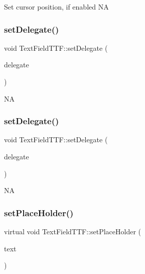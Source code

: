 Set cursor position, if enabled  NA \mbox{\label{classTextFieldTTF_a536d7e986a4623672a6a1506dc5b6684}} 
\subsubsection{\texorpdfstring{set\+Delegate()}{setDelegate()}\hspace{0.1cm}{\footnotesize\ttfamily [1/2]}}
{\footnotesize\ttfamily void Text\+Field\+T\+T\+F\+::set\+Delegate (\begin{DoxyParamCaption}\item[{\hyperlink{classTextFieldDelegate}{Text\+Field\+Delegate} $\ast$}]{delegate }\end{DoxyParamCaption})\hspace{0.3cm}{\ttfamily [inline]}}

NA \mbox{\label{classTextFieldTTF_a536d7e986a4623672a6a1506dc5b6684}} 
\subsubsection{\texorpdfstring{set\+Delegate()}{setDelegate()}\hspace{0.1cm}{\footnotesize\ttfamily [2/2]}}
{\footnotesize\ttfamily void Text\+Field\+T\+T\+F\+::set\+Delegate (\begin{DoxyParamCaption}\item[{\hyperlink{classTextFieldDelegate}{Text\+Field\+Delegate} $\ast$}]{delegate }\end{DoxyParamCaption})\hspace{0.3cm}{\ttfamily [inline]}}

NA \mbox{\label{classTextFieldTTF_a7bba66ec520bca4f92dd877c8012037c}} 
\subsubsection{\texorpdfstring{set\+Place\+Holder()}{setPlaceHolder()}\hspace{0.1cm}{\footnotesize\ttfamily [1/2]}}
{\footnotesize\ttfamily virtual void Text\+Field\+T\+T\+F\+::set\+Place\+Holder (\begin{DoxyParamCaption}\item[{const std\+::string \&}]{text }\end{DoxyParamCaption})\hspace{0.3cm}{\ttfamily [virtual]}}

